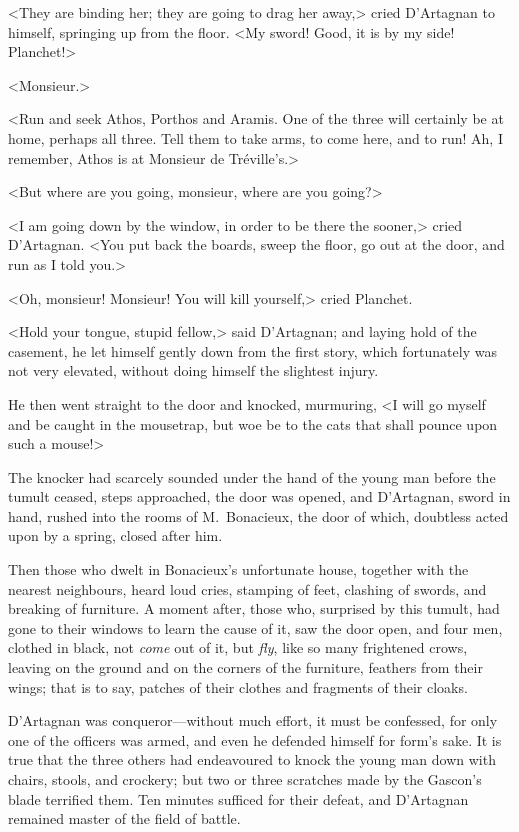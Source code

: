 <They are binding her; they are going to drag her away,> cried D'Artagnan to himself, springing up from the floor. <My sword! Good, it is by my side! Planchet!> 

<Monsieur.> 

<Run and seek Athos, Porthos and Aramis. One of the three will certainly be at home, perhaps all three. Tell them to take arms, to come here, and to run! Ah, I remember, Athos is at Monsieur de Tréville's.> 

<But where are you going, monsieur, where are you going?> 

<I am going down by the window, in order to be there the sooner,> cried D'Artagnan. <You put back the boards, sweep the floor, go out at the door, and run as I told you.> 

<Oh, monsieur! Monsieur! You will kill yourself,> cried Planchet. 

<Hold your tongue, stupid fellow,> said D'Artagnan; and laying hold of the casement, he let himself gently down from the first story, which fortunately was not very elevated, without doing himself the slightest injury. 

He then went straight to the door and knocked, murmuring, <I will go myself and be caught in the mousetrap, but woe be to the cats that shall pounce upon such a mouse!> 

The knocker had scarcely sounded under the hand of the young man before the tumult ceased, steps approached, the door was opened, and D'Artagnan, sword in hand, rushed into the rooms of M.~Bonacieux, the door of which, doubtless acted upon by a spring, closed after him. 

Then those who dwelt in Bonacieux's unfortunate house, together with the nearest neighbours, heard loud cries, stamping of feet, clashing of swords, and breaking of furniture. A moment after, those who, surprised by this tumult, had gone to their windows to learn the cause of it, saw the door open, and four men, clothed in black, not \emph{come} out of it, but \emph{fly}, like so many frightened crows, leaving on the ground and on the corners of the furniture, feathers from their wings; that is to say, patches of their clothes and fragments of their cloaks. 

D'Artagnan was conqueror—without much effort, it must be confessed, for only one of the officers was armed, and even he defended himself for form's sake. It is true that the three others had endeavoured to knock the young man down with chairs, stools, and crockery; but two or three scratches made by the Gascon's blade terrified them. Ten minutes sufficed for their defeat, and D'Artagnan remained master of the field of battle. 

